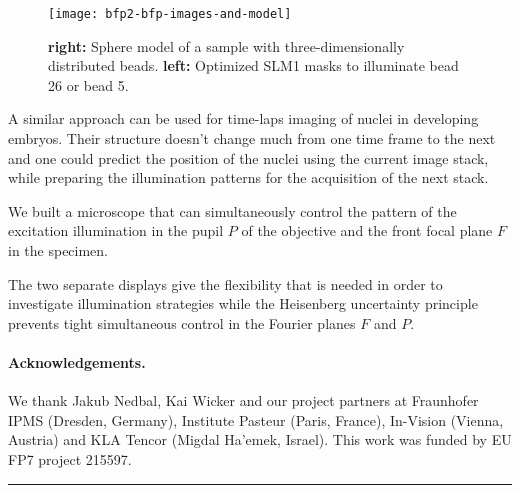 \documentclass[a4paper, 11pt]{article}
\begin{document}
\begin{multicols}{2}
\begin{figure}[H]
 \centering
 \texttt{[image: bfp2-bfp-images-and-model]}
\caption{{\bf right:} Sphere model of a
  sample with three-dimensionally distributed beads. {\bf left:}
  Optimized SLM1 masks to illuminate bead 26 or bead 5.}
\label{fig:ray}
\end{figure}


A similar approach can be used for time-laps imaging of nuclei in
developing embryos. Their structure doesn't change much from one time
frame to the next and one could predict the position of the nuclei
using the current image stack, while preparing the illumination
patterns for the acquisition of the next stack.


 We built a microscope that can
simultaneously control the pattern of the excitation illumination in
the pupil $P$ of the objective and the front focal plane $F$ in the
specimen.

The two separate displays give the flexibility that is needed in order
to investigate illumination strategies while the Heisenberg
uncertainty principle prevents tight simultaneous control in the
Fourier planes $F$ and $P$.

{\scriptsize
\paragraph{Acknowledgements.}
We thank Jakub Nedbal, Kai Wicker and our project partners at
Fraunhofer IPMS (Dresden, Germany), Institute Pasteur (Paris, France),
In-Vision (Vienna, Austria) and KLA Tencor (Migdal Ha'emek,
Israel). This work was funded by EU FP7 project 215597.}
\end{multicols}

\begin{center}
\rule{0.75\textwidth}{1pt}
\end{center}



\end{document}
